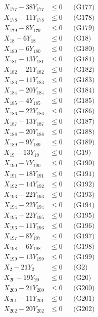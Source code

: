 \documentclass[a4paper,10pt]{article}
\begin{document}
{\begin{align}
X_{177} - 38Y_{177} &\leq 0 && \text{(G177)} \\
X_{178} - 11Y_{178} &\leq 0 && \text{(G178)} \\
X_{179} - 8Y_{179} &\leq 0 && \text{(G179)} \\
X_{18} - 6Y_{18} &\leq 0 && \text{(G18)} \\
X_{180} - 6Y_{180} &\leq 0 && \text{(G180)} \\
X_{181} - 13Y_{181} &\leq 0 && \text{(G181)} \\
X_{182} - 21Y_{182} &\leq 0 && \text{(G182)} \\
X_{183} - 11Y_{183} &\leq 0 && \text{(G183)} \\
X_{184} - 20Y_{184} &\leq 0 && \text{(G184)} \\
X_{185} - 4Y_{185} &\leq 0 && \text{(G185)} \\
X_{186} - 22Y_{186} &\leq 0 && \text{(G186)} \\
X_{187} - 13Y_{187} &\leq 0 && \text{(G187)} \\
X_{188} - 20Y_{188} &\leq 0 && \text{(G188)} \\
\allowbreak
X_{189} - 9Y_{189} &\leq 0 && \text{(G189)} \\
X_{19} - 13Y_{19} &\leq 0 && \text{(G19)} \\
X_{190} - 7Y_{190} &\leq 0 && \text{(G190)} \\
X_{191} - 18Y_{191} &\leq 0 && \text{(G191)} \\
X_{192} - 14Y_{192} &\leq 0 && \text{(G192)} \\
X_{193} - 22Y_{193} &\leq 0 && \text{(G193)} \\
X_{194} - 22Y_{194} &\leq 0 && \text{(G194)} \\
X_{195} - 22Y_{195} &\leq 0 && \text{(G195)} \\
X_{196} - 11Y_{196} &\leq 0 && \text{(G196)} \\
X_{197} - 8Y_{197} &\leq 0 && \text{(G197)} \\
X_{198} - 6Y_{198} &\leq 0 && \text{(G198)} \\
X_{199} - 13Y_{199} &\leq 0 && \text{(G199)} \\
X_{2} - 21Y_{2} &\leq 0 && \text{(G2)} \\
X_{20} - 19Y_{20} &\leq 0 && \text{(G20)} \\
X_{200} - 21Y_{200} &\leq 0 && \text{(G200)} \\
X_{201} - 11Y_{201} &\leq 0 && \text{(G201)} \\
X_{202} - 20Y_{202} &\leq 0 && \text{(G202)} \\

\end{align}}
\end{document}
